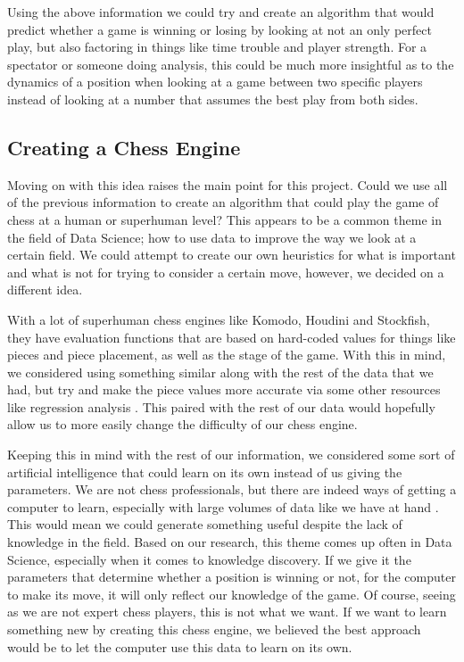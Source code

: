 \documentclass[12pt]{article}
\begin{document}
    Using the above information we could try and create an algorithm that would predict whether a game is winning or losing by looking at not an only perfect play, but also factoring in things like time trouble and player strength. For a spectator or someone doing analysis, this could be much more insightful as to the dynamics of a position when looking at a game between two specific players instead of looking at a number that assumes the best play from both sides.

    \subsection{Creating a Chess Engine}

    Moving on with this idea raises the main point for this project. Could we use all of the previous information to create an algorithm that could play the game of chess at a human or superhuman level? This appears to be a common theme in the field of Data Science; how to use data to improve the way we look at a certain field. We could attempt to create our own heuristics for what is important and what is not for trying to consider a certain move, however, we decided on a different idea. 

    With a lot of superhuman chess engines like Komodo, Houdini and Stockfish, they have evaluation functions that are based on hard-coded values for things like pieces and piece placement, as well as the stage of the game. With this in mind, we considered using something similar along with the rest of the data that we had, but try and make the piece values more accurate via some other resources like regression analysis \cite{piece_values}. This paired with the rest of our data would hopefully allow us to more easily change the difficulty of our chess engine. 

    Keeping this in mind with the rest of our information, we considered some sort of artificial intelligence that could learn on its own instead of us giving the parameters. We are not chess professionals, but there are indeed ways of getting a computer to learn, especially with large volumes of data like we have at hand \cite{mltypes_book}\cite{mlbook}. This would mean we could generate something useful despite the lack of knowledge in the field. Based on our research, this theme comes up often in Data Science, especially when it comes to knowledge discovery. If we give it the parameters that determine whether a position is winning or not, for the computer to make its move, it will only reflect our knowledge of the game. Of course, seeing as we are not expert chess players, this is not what we want. If we want to learn something new by creating this chess engine, we believed the best approach would be to let the computer use this data to learn on its own.
\end{document}
